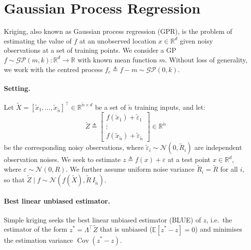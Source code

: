 \section{Gaussian Process Regression}
\label{sec:kriging}

Kriging, also known as Gaussian process regression (GPR), is the problem of
estimating the value of $f$ at an unobserved location $x \in \mathbb{R}^d$
given noisy observations at a set of training points. We consider a GP
$f \sim \mathcal{GP}(m, k) : \mathbb{R}^d \to \mathbb{R}$ with known mean
function $m$. Without loss of generality, we work with the centred process
$f_c \triangleq f - m \sim \mathcal{GP}(0, k)$.

\paragraph{Setting.} Let $\tilde{X} = [\tilde{x}_1, \ldots,
\tilde{x}_{\tilde{n}}]^\top \in \mathbb{R}^{\tilde{n} \times d}$ be a set of
$\tilde{n}$ training inputs, and let:
\begin{equation}
    \tilde{Z} \triangleq
    \begin{bmatrix} f(\tilde{x}_1) + \tilde\varepsilon_1 \\ \vdots \\
    f(\tilde{x}_{\tilde{n}}) + \tilde\varepsilon_{\tilde{n}} \end{bmatrix}
    \in \mathbb{R}^{\tilde{n}}
    \label{eq:training_data}
\end{equation}
be the corresponding noisy observations, where
$\tilde\varepsilon_i \sim \mathcal{N}(0, \tilde{R}_i)$ are independent
observation noises. We seek to estimate $z \triangleq f(x) + \varepsilon$ at a
test point $x \in \mathbb{R}^d$, where $\varepsilon \sim \mathcal{N}(0, R)$.
We further assume uniform noise variance $\tilde{R}_i = \tilde{R}$ for all $i$,
so that $\tilde{Z} \mid f \sim \mathcal{N}(f(\tilde{X}), \tilde{R}\,
I_{\tilde{n}})$.

\paragraph{Best linear unbiased estimator.} Simple kriging seeks the best
linear unbiased estimator (BLUE) of $z$, i.e.\ the estimator of the form
$z^* = \Lambda^\top \tilde{Z}$ that is unbiased ($\mathbb{E}[z^* - z] = 0$)
and minimises the estimation variance $\operatorname{Cov}(z^* - z)$.

